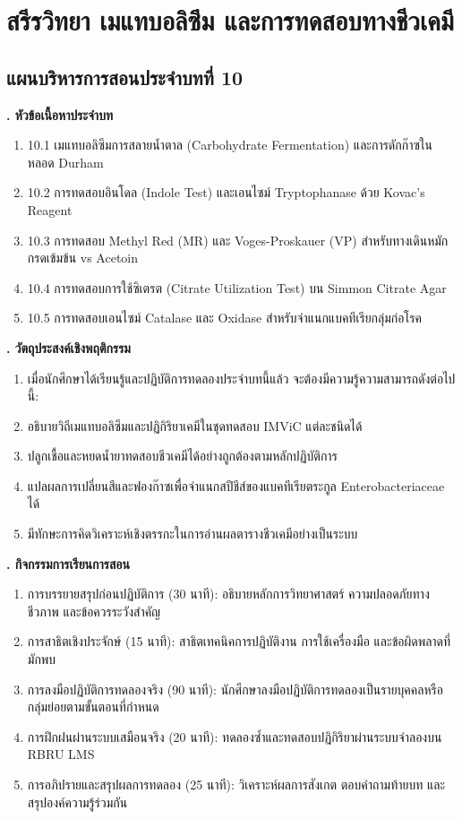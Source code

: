 \chapter{สรีรวิทยา เมแทบอลิซึม และการทดสอบทางชีวเคมี}
\label{chap:ch10}

\section*{แผนบริหารการสอนประจำบทที่ 10}

\noindent\textbf{. หัวข้อเนื้อหาประจำบท}

\begin{enumerate}
    \item 10.1 เมแทบอลิซึมการสลายน้ำตาล (Carbohydrate Fermentation) และการดักก๊าซในหลอด Durham
    \item 10.2 การทดสอบอินโดล (Indole Test) และเอนไซม์ Tryptophanase ด้วย Kovac's Reagent
    \item 10.3 การทดสอบ Methyl Red (MR) และ Voges-Proskauer (VP) สำหรับทางเดินหมักกรดเข้มข้น vs Acetoin
    \item 10.4 การทดสอบการใช้ซิเตรต (Citrate Utilization Test) บน Simmon Citrate Agar
    \item 10.5 การทดสอบเอนไซม์ Catalase และ Oxidase สำหรับจำแนกแบคทีเรียกลุ่มก่อโรค
\end{enumerate}

\noindent\textbf{. วัตถุประสงค์เชิงพฤติกรรม}

\begin{enumerate}
    \item เมื่อนักศึกษาได้เรียนรู้และปฏิบัติการทดลองประจำบทนี้แล้ว จะต้องมีความรู้ความสามารถดังต่อไปนี้:
    \item อธิบายวิถีเมแทบอลิซึมและปฏิกิริยาเคมีในชุดทดสอบ IMViC แต่ละชนิดได้
    \item ปลูกเชื้อและหยดน้ำยาทดสอบชีวเคมีได้อย่างถูกต้องตามหลักปฏิบัติการ
    \item แปลผลการเปลี่ยนสีและฟองก๊าซเพื่อจำแนกสปีชีส์ของแบคทีเรียตระกูล Enterobacteriaceae ได้
    \item มีทักษะการคิดวิเคราะห์เชิงตรรกะในการอ่านผลตารางชีวเคมีอย่างเป็นระบบ
\end{enumerate}

\noindent\textbf{. กิจกรรมการเรียนการสอน}

\begin{enumerate}
    \item การบรรยายสรุปก่อนปฏิบัติการ (30 นาที): อธิบายหลักการวิทยาศาสตร์ ความปลอดภัยทางชีวภาพ และข้อควรระวังสำคัญ
    \item การสาธิตเชิงประจักษ์ (15 นาที): สาธิตเทคนิคการปฏิบัติงาน การใช้เครื่องมือ และข้อผิดพลาดที่มักพบ
    \item การลงมือปฏิบัติการทดลองจริง (90 นาที): นักศึกษาลงมือปฏิบัติการทดลองเป็นรายบุคคลหรือกลุ่มย่อยตามขั้นตอนที่กำหนด
    \item การฝึกฝนผ่านระบบเสมือนจริง (20 นาที): ทดลองซ้ำและทดสอบปฏิกิริยาผ่านระบบจำลองบน RBRU LMS
    \item การอภิปรายและสรุปผลการทดลอง (25 นาที): วิเคราะห์ผลการสังเกต ตอบคำถามท้ายบท และสรุปองค์ความรู้ร่วมกัน
\end{enumerate}

